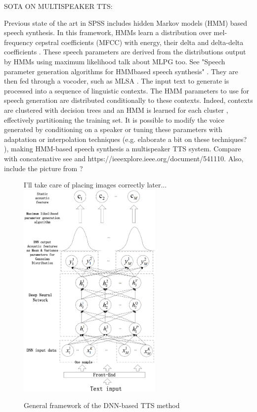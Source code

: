 \documentclass[a4paper, oneside]{article}
\begin{document}
SOTA ON MULTISPEAKER TTS:
\color{black}

Previous state of the art in SPSS includes hidden Markov models (HMM) based speech synthesis. In this framework, HMMs learn a distribution over mel-frequency cepstral coefficients (MFCC) with energy, their delta and delta-delta coefficients \cite{TTSSOTA}. These speech parameters are derived from the distributions output by HMMs using maximum likelihood  \color{red} talk about MLPG too. See "Speech parameter generation algorithms for HMMbased
speech synthesis" \color{black}. They are then fed through a vocoder, such as MLSA \cite{MLSA}. The input text to generate is processed into a sequence of linguistic contexts. The HMM parameters to use for speech generation are distributed conditionally to these contexts. Indeed, contexts are clustered with decision trees and an HMM is learned for each cluster \cite{HMMTTS}, effectively partitioning the training set. It is possible to modify the voice generated by conditioning on a speaker or tuning these parameters with adaptation or interpolation techniques (e.g. \cite{HMMSpeakerInterpolation}  \color{red} elaborate a bit on these techniques? \color{black}), making HMM-based speech synthesis a multispeaker TTS system. \color{red} Compare with concatenative see \cite{SPSSDNN} and https://ieeexplore.ieee.org/document/541110. Also, include the picture from \cite{Hashimoto-2015}? \color{black}

\begin{figure}
	\color{red} I'll take care of placing images correctly later... \color{black}
	\vspace{0cm}
	\centering
	\includegraphics[width=7cm]{images/dnn_spss.png}
	\caption{General framework of the DNN-based TTS method \cite{Lu_combininga}}
	\label{dnn_tts_framework}
	\vspace{0cm}
\end{figure}
\end{document}
